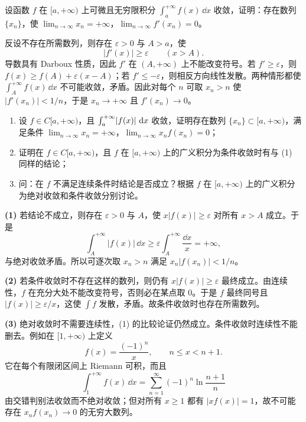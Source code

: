 \begin{xexercise}[5]
设函数 $f$ 在 $[a,+\infty)$ 上可微且无穷限积分 $\int_a^{+\infty}f(x)\,\dd x$ 收敛，证明：存在数列 $\{x_n\}$，使 $\lim_{n\to\infty}x_n=+\infty$，$\lim_{n\to\infty}f'(x_n)=0$。
\end{xexercise}
\begin{xsolution}
反设不存在所需数列，则存在 $\varepsilon>0$ 与 $A>a$，使
\[
  |f'(x)|\geq\varepsilon\qquad(x>A).
\]
导数具有 Darboux 性质，因此 $f'$ 在 $(A,+\infty)$ 上不能改变符号。若 $f'\geq\varepsilon$，则
$f(x)\geq f(A)+\varepsilon(x-A)$；若 $f'\leq-\varepsilon$，则相反方向线性发散。两种情形都使 $\int_A^{+\infty}f(x)\,\dd x$ 不可能收敛，矛盾。因此对每个 $n$ 可取 $x_n>n$ 使 $|f'(x_n)|<1/n$，于是 $x_n\to+\infty$ 且 $f'(x_n)\to0$。
\end{xsolution}


\begin{xexercise}[6]
\begin{enumerate}[label=(\arabic*)]
    \item 设 $f\in C[a,+\infty)$，且 $\int_a^{+\infty}\lvert f(x)\rvert\,\mathop{}\!\mathrm{d} x$ 收敛，证明存在数列 $\{x_n\}\subset[a,+\infty)$，满足条件 $\lim_{n\to\infty}x_n=+\infty$，$\lim_{n\to\infty}x_nf(x_n)=0$；
    \item 证明在 $f\in C[a,+\infty)$，且 $f$ 在 $[a,+\infty)$ 上的广义积分为条件收敛时有与 (1) 同样的结论；
    \item 问：在 $f$ 不满足连续条件时结论是否成立？根据 $f$ 在 $[a,+\infty)$ 上的广义积分为绝对收敛和条件收敛分别讨论。
  \end{enumerate}
\end{xexercise}
\begin{xsolution}
\textbf{(1)} 若结论不成立，则存在 $\varepsilon>0$ 与 $A$，使 $x|f(x)|\geq\varepsilon$ 对所有 $x>A$ 成立。于是
\[
  \int_A^{+\infty}|f(x)|\,\dd x
  \geq\varepsilon\int_A^{+\infty}\frac{\dd x}{x}=+\infty,
\]
与绝对收敛矛盾。所以可逐次取 $x_n>n$ 满足 $x_n|f(x_n)|<1/n$。

\textbf{(2)} 若条件收敛时不存在这样的数列，则仍有 $x|f(x)|\geq\varepsilon$ 最终成立。由连续性，$f$ 在充分大处不能改变符号，否则必在某点取 $0$。于是 $f$ 最终同号且 $|f(x)|\geq\varepsilon/x$，这使 $\int f$ 发散，矛盾。故条件收敛时也存在所需数列。

\textbf{(3)} 绝对收敛时不需要连续性，(1) 的比较论证仍然成立。条件收敛时连续性不能删去。例如在 $[1,+\infty)$ 上定义
\[
  f(x)=\frac{(-1)^n}{x},\qquad n\leq x<n+1.
\]
它在每个有限闭区间上 Riemann 可积，而且
\[
  \int_1^{+\infty}f(x)\,\dd x
  =\sum_{n=1}^{\infty}(-1)^n\ln\frac{n+1}{n}
\]
由交错判别法收敛而不绝对收敛；但对所有 $x\geq1$ 都有 $|xf(x)|=1$，故不可能存在 $x_nf(x_n)\to0$ 的无穷大数列。
\end{xsolution}


